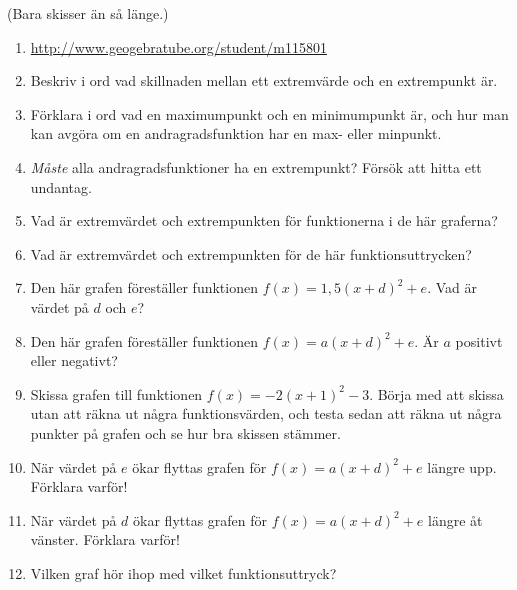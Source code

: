 (Bara skisser än så länge.)

\begin{enumerate}[label=\bfseries Uppgift \chapter . \arabic*:]
  \item \url{http://www.geogebratube.org/student/m115801}
  \item Beskriv i ord vad skillnaden mellan ett extremvärde och en extrempunkt är.
  \item Förklara i ord vad en maximumpunkt och en minimumpunkt är, och hur man kan avgöra om en andragradsfunktion har en max- eller minpunkt.
  \item \emph{Måste} alla andragradsfunktioner ha en extrempunkt? Försök att hitta ett undantag.
  \item Vad är extremvärdet och extrempunkten för funktionerna i de här graferna?
  \item Vad är extremvärdet och extrempunkten för de här funktionsuttrycken?
  \item Den här grafen föreställer funktionen $f(x)=1{,}5(x+d)^2+e$. Vad är värdet på $d$ och $e$?
  \item Den här grafen föreställer funktionen $f(x)=a(x+d)^2+e$. Är $a$ positivt eller negativt?
  \item Skissa grafen till funktionen $f(x)=-2(x+1)^2-3$.
  Börja med att skissa utan att räkna ut några funktionsvärden, och testa sedan att räkna ut några punkter på grafen och se hur bra skissen stämmer.
  \item När värdet på $e$ ökar flyttas grafen för $f(x)=a(x+d)^2+e$ längre upp. Förklara varför!
  \item När värdet på $d$ ökar flyttas grafen för $f(x)=a(x+d)^2+e$ längre åt vänster. Förklara varför!
  \item Vilken graf hör ihop med vilket funktionsuttryck?

\end{enumerate}
